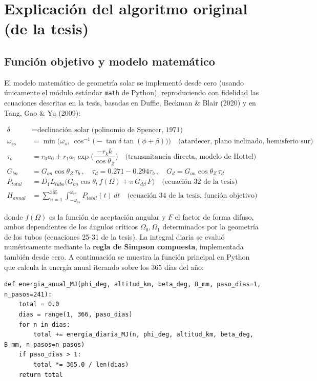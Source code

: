 \documentclass[11pt,a4paper]{article}
\begin{document}
\section{Explicación del algoritmo original (de la tesis)}

\subsection{Función objetivo y modelo matemático}

El modelo matemático de geometría solar se implementó desde cero (usando
únicamente el módulo estándar \texttt{math} de Python), reproduciendo con
fidelidad las ecuaciones descritas en la tesis, basadas en Duffie, Beckman \&
Blair (2020) y en Tang, Gao \& Yu (2009):

\begin{align}
\delta &= \text{declinación solar (polinomio de Spencer, 1971)}\\
\omega_{ss} &= \min\!\Big(\omega_s,\ \cos^{-1}\!\big(-\tan\delta\tan(\phi+\beta)\big)\Big)
  \quad \text{(atardecer, plano inclinado, hemisferio sur)}\\
\tau_b &= r_0 a_0 + r_1 a_1 \exp\!\Big(\dfrac{-r_k k}{\cos\theta_Z}\Big)
  \quad \text{(transmitancia directa, modelo de Hottel)}\\
G_{bn} &= G_{on}\cos\theta_Z\,\tau_b \, ,\quad
   \tau_d = 0.271-0.294\tau_b \, ,\quad G_d = G_{on}\cos\theta_Z\,\tau_d\\
P_{total} &= D_1 L_{tubo}\Big(G_{bn}\cos\theta_t\, f(\Omega) + \pi\, G_{d\beta}\, F\Big)
  \quad \text{(ecuación 32 de la tesis)}\\
H_{anual} &= \sum_{n=1}^{365}\int_{-\omega_{ss}}^{\omega_{ss}} P_{total}(t)\, dt
  \quad \text{(ecuación 34 de la tesis, función objetivo)}
\end{align}

donde $f(\Omega)$ es la función de aceptación angular y $F$ el factor de
forma difuso, ambos dependientes de los ángulos críticos $\Omega_0,\Omega_1$
determinados por la geometría de los tubos (ecuaciones 25-31 de la tesis).
La integral diaria se evaluó numéricamente mediante la \textbf{regla de
Simpson compuesta}, implementada también desde cero. A continuación se
muestra la función principal en Python que calcula la energía anual iterando
sobre los 365 días del año:

\begin{lstlisting}
def energia_anual_MJ(phi_deg, altitud_km, beta_deg, B_mm, paso_dias=1, n_pasos=241):
    total = 0.0
    dias = range(1, 366, paso_dias)
    for n in dias:
        total += energia_diaria_MJ(n, phi_deg, altitud_km, beta_deg, B_mm, n_pasos=n_pasos)
    if paso_dias > 1:
        total *= 365.0 / len(dias)
    return total
\end{lstlisting}
\end{document}

